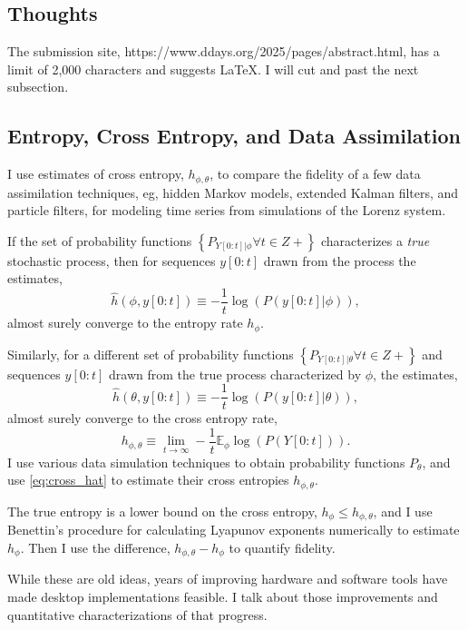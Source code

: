 \documentclass{article}
\begin{document}
\subsection*{Thoughts}
\label{thoughts}

The submission site, https://www.ddays.org/2025/pages/abstract.html,
has a limit of 2,000 characters and suggests LaTeX.  I will cut and
past the next subsection.

\subsection*{Entropy, Cross Entropy, and Data Assimilation}
\label{sec:entropy}

I use estimates of cross entropy, $h_{\phi,\theta}$, to compare the
fidelity of a few data assimilation techniques, eg, hidden Markov
models, extended Kalman filters, and particle filters, for modeling
time series from simulations of the Lorenz system.

If the set of probability functions
$\left\{P_{Y[0:t]|\phi} \forall t \in Z+ \right\}$ characterizes a
\emph{true} stochastic process, then for sequences $y[0:t]$ drawn from
the process the estimates,
\begin{equation*}
  \hat h(\phi, y[0:t]) \equiv -\frac{1}{t} \log \left( P(y[0:t]|\phi ) \right),
\end{equation*}
almost surely converge to the entropy rate $h_\phi$.

Similarly, for a different set of probability functions
$\left\{P_{Y[0:t]|\theta} \forall t \in Z+ \right\}$ and sequences
$y[0:t]$ drawn from the true process characterized by $\phi$, the
estimates,
\begin{equation}
  \label{eq:cross_hat}
  \hat h(\theta, y[0:t]) \equiv -\frac{1}{t} \log \left( P(y[0:t]|\theta ) \right),
\end{equation}
almost surely converge to the cross entropy rate,
\begin{equation*}
  h_{\phi,\theta} \equiv \lim_{t \rightarrow \infty} -\frac{1}{t}
  \mathbb{E}_{\phi} \log\left( P(Y[0:t]) \right).
\end{equation*}
I use various data simulation techniques to obtain probability
functions $P_\theta$, and use \eqref{eq:cross_hat} to estimate their
cross entropies $h_{\phi,\theta}$.

The true entropy is a lower bound on the cross entropy,
$h_\phi \leq h_{\phi,\theta}$, and I use Benettin's procedure for
calculating Lyapunov exponents numerically to estimate $h_\phi$.  Then
I use the difference, $h_{\phi,\theta} - h_\phi$ to quantify fidelity.

While these are old ideas, years of improving hardware and software
tools have made desktop implementations feasible.  I talk about those
improvements and quantitative characterizations of that progress.
\end{document}
